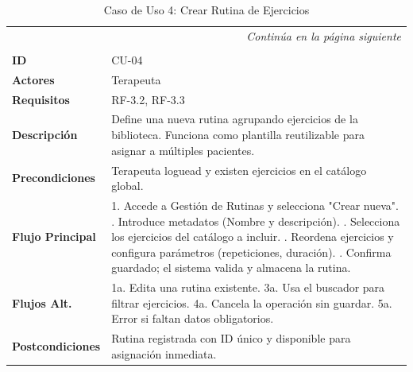 \clearpage
\begin{longtable}{p{} p{}}
    \toprule
    \endfirsthead
    \toprule
    \endhead
    \midrule
    \multicolumn{2}{r}{\small\itshape Continúa en la página siguiente} \\
    \endfoot
    \bottomrule
    \noalign{\vspace{0.5cm}}
    \caption{Caso de Uso 4: Crear Rutina de Ejercicios} \label{cu:4} \\
    \endlastfoot

    \textbf{ID} & CU-04 \\ \midrule
    \textbf{Actores} & Terapeuta \\ \midrule
    \textbf{Requisitos} & RF-3.2, RF-3.3 \\ \midrule
    \textbf{Descripción} & Define una nueva rutina agrupando ejercicios de la biblioteca. Funciona como plantilla reutilizable para asignar a múltiples pacientes. \\ \midrule
    \textbf{Precondiciones} & Terapeuta loguead y existen ejercicios en el catálogo global. \\ \midrule
    \textbf{Flujo Principal} & 
    1. Accede a Gestión de Rutinas y selecciona "Crear nueva". \newline
    2. Introduce metadatos (Nombre y descripción). \newline
    3. Selecciona los ejercicios del catálogo a incluir. \newline
    4. Reordena ejercicios y configura parámetros (repeticiones, duración). \newline
    5. Confirma guardado; el sistema valida y almacena la rutina. \\ \midrule
    \textbf{Flujos Alt.} & 
    1a. Edita una rutina existente. \newline
    3a. Usa el buscador para filtrar ejercicios. \newline
    4a. Cancela la operación sin guardar. \newline
    5a. Error si faltan datos obligatorios. \\ \midrule
    \textbf{Postcondiciones} & Rutina registrada con ID único y disponible para asignación inmediata. \\
\end{longtable}

